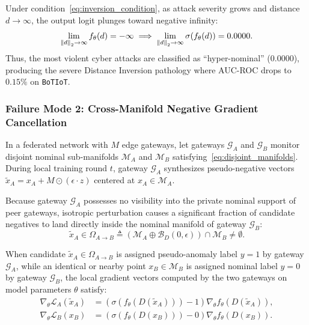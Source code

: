 Under condition~\eqref{eq:inversion_condition}, as attack severity grows and distance $d \to \infty$, the output logit plunges toward negative infinity:
\begin{equation}
\lim_{\left\lVert d\right\rVert_2 \to \infty} f_\theta(d) = -\infty \implies \lim_{\left\lVert d\right\rVert_2 \to \infty} \sigma(f_\theta(d)) = 0.0000.
\end{equation}
Thus, the most violent cyber attacks are classified as ``hyper-nominal'' ($0.0000$), producing the severe Distance Inversion pathology where AUC-ROC drops to $0.15\%$ on \texttt{BoTIoT}.

\subsubsection{Failure Mode 2: Cross-Manifold Negative Gradient Cancellation}
In a federated network with $M$ edge gateways, let gateways $\mathcal{G}_A$ and $\mathcal{G}_B$ monitor disjoint nominal sub-manifolds $\mathcal{M}_A$ and $\mathcal{M}_B$ satisfying~\eqref{eq:disjoint_manifolds}. During local training round $t$, gateway $\mathcal{G}_A$ synthesizes pseudo-negative vectors $\tilde{x}_A = x_A + M \odot (\epsilon \cdot z)$ centered at $x_A \in \mathcal{M}_A$. 

Because gateway $\mathcal{G}_A$ possesses no visibility into the private nominal support of peer gateways, isotropic perturbation causes a significant fraction of candidate negatives to land directly inside the nominal manifold of gateway $\mathcal{G}_B$:
\begin{equation}
\label{eq:intrusion_set}
\tilde{x}_A \in \Omega_{A \to B} \triangleq \left( \mathcal{M}_A \oplus \mathcal{B}_D(0, \epsilon) \right) \cap \mathcal{M}_B \neq \emptyset.
\end{equation}

When candidate $\tilde{x}_A \in \Omega_{A \to B}$ is assigned pseudo-anomaly label $y=1$ by gateway $\mathcal{G}_A$, while an identical or nearby point $x_B \in \mathcal{M}_B$ is assigned nominal label $y=0$ by gateway $\mathcal{G}_B$, the local gradient vectors computed by the two gateways on model parameters $\theta$ satisfy:
\begin{align}
\label{eq:grad_A}
\nabla_\theta \mathcal{L}_A(\tilde{x}_A) &= \left( \sigma(f_\theta(D(\tilde{x}_A))) - 1 \right) \nabla_\theta f_\theta(D(\tilde{x}_A)), \\
\label{eq:grad_B}
\nabla_\theta \mathcal{L}_B(x_B) &= \left( \sigma(f_\theta(D(x_B))) - 0 \right) \nabla_\theta f_\theta(D(x_B)).
\end{align}

